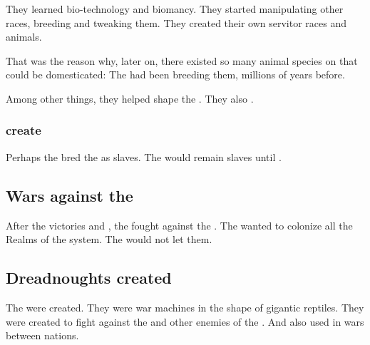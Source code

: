 They learned bio-technology and biomancy. 
They started manipulating other races, breeding and tweaking them. 
They created their own servitor races and animals. 

That was the reason why, later on, there existed so many animal species on \Miith{} that could be domesticated: 
The \ophidians{} had been breeding them, millions of years before. 

Among other things, they helped shape the . 
They also . 





\subsubsection{\Ophidians create \nephilim}
Perhaps the \ophidians bred the \nephilim as slaves.
The \nephilim would remain slaves until . 









\subsection{Wars against the \vorcanths}
After the victories  and , the \ophidians fought against the \vorcanths. 
The \ophidians wanted to colonize all the Realms of the system. 
The \vorcanths would not let them. 









\subsection{Dreadnoughts created}
The  were created. 
They were war machines in the shape of gigantic reptiles. 
They were created to fight against the \vorcanths and other enemies of the \ophidians.
And also used in wars between \ophidian nations. 









